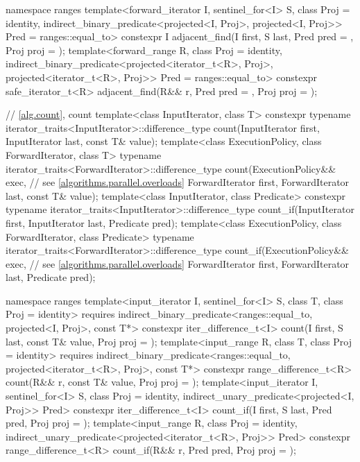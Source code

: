 \begin{codeblock}
{  namespace ranges {
    template<forward_iterator I, sentinel_for<I> S, class Proj = identity,
             indirect_binary_predicate<projected<I, Proj>,
                                       projected<I, Proj>> Pred = ranges::equal_to>
      constexpr I adjacent_find(I first, S last, Pred pred = {},
                                Proj proj = {});
    template<forward_range R, class Proj = identity,
             indirect_binary_predicate<projected<iterator_t<R>, Proj>,
                                       projected<iterator_t<R>, Proj>> Pred = ranges::equal_to>
      constexpr safe_iterator_t<R>
        adjacent_find(R&& r, Pred pred = {}, Proj proj = {});
  }

  // \ref{alg.count}, count
  template<class InputIterator, class T>
    constexpr typename iterator_traits<InputIterator>::difference_type
      count(InputIterator first, InputIterator last, const T& value);
  template<class ExecutionPolicy, class ForwardIterator, class T>
    typename iterator_traits<ForwardIterator>::difference_type
      count(ExecutionPolicy&& exec,                             // see \ref{algorithms.parallel.overloads}
            ForwardIterator first, ForwardIterator last, const T& value);
  template<class InputIterator, class Predicate>
    constexpr typename iterator_traits<InputIterator>::difference_type
      count_if(InputIterator first, InputIterator last, Predicate pred);
  template<class ExecutionPolicy, class ForwardIterator, class Predicate>
    typename iterator_traits<ForwardIterator>::difference_type
      count_if(ExecutionPolicy&& exec,                          // see \ref{algorithms.parallel.overloads}
               ForwardIterator first, ForwardIterator last, Predicate pred);

  namespace ranges {
    template<input_iterator I, sentinel_for<I> S, class T, class Proj = identity>
      requires indirect_binary_predicate<ranges::equal_to, projected<I, Proj>, const T*>
      constexpr iter_difference_t<I>
        count(I first, S last, const T& value, Proj proj = {});
    template<input_range R, class T, class Proj = identity>
      requires indirect_binary_predicate<ranges::equal_to,
                                         projected<iterator_t<R>, Proj>, const T*>
      constexpr range_difference_t<R>
        count(R&& r, const T& value, Proj proj = {});
    template<input_iterator I, sentinel_for<I> S, class Proj = identity,
             indirect_unary_predicate<projected<I, Proj>> Pred>
      constexpr iter_difference_t<I>
        count_if(I first, S last, Pred pred, Proj proj = {});
    template<input_range R, class Proj = identity,
             indirect_unary_predicate<projected<iterator_t<R>, Proj>> Pred>
      constexpr range_difference_t<R>
        count_if(R&& r, Pred pred, Proj proj = {});
  }

}
\end{codeblock}
